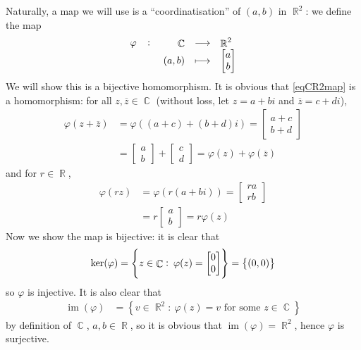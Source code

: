 \documentclass{amsart}
\theoremstyle{definition}
\theoremstyle{definition}
\DeclareMathOperator{\R}{\mathbb{R}}
\DeclareMathOperator{\Com}{\mathbb{C}}
\DeclareMathOperator{\im}{im}
\DeclareMathOperator{\1}{\mathbbm{1}}
\renewcommand{\phi}{\varphi}
\newcommand{\condset}[4]{\left\{ #1  : \: #2 #3 #4 \right\}}
\begin{document}
\begin{enumerate}
\begin{enumerate}[label=\arabic*.]
			Naturally, a map we will use is a ``coordinatisation'' of $(a,b)$ in $\R^2$: we define the map
			\begin{equation}
			\label{eqCR2map}
				\fullfunction{\phi}{\Com}{\R^2}{(a,b)}{\begin{bmatrix}
					a \\ b
					\end{bmatrix}}
			\end{equation}
			We will show this is a bijective homomorphism. It is obvious that \eqref{eqCR2map} is a homomorphism: for all $z, \overline{z} \in \Com$ (without loss, let $z = a+bi$ and $\overline{z}=c + di$),
			\begin{align*}
			\phi(z + \overline{z}) &= \phi( (a+c) + (b+d)i ) = \begin{bmatrix}
			a+ c \\ b+d
			\end{bmatrix} \\
			&= \begin{bmatrix}
			a \\ b
			\end{bmatrix} + \begin{bmatrix}
			c \\ d
			\end{bmatrix} = \phi(z) + \phi(\overline{z})
			\end{align*}
			and for $r \in \R$,
			\begin{align*}
			\phi(rz) &= \phi(r(a+bi)) = \begin{bmatrix}
			ra \\ rb
			\end{bmatrix} \\
			&= r \begin{bmatrix}
			a \\ b
			\end{bmatrix} = r\phi(z)
			\end{align*}
			Now we show the map is bijective: it is clear that 
			\begin{align*}
			\ker(\phi) = \condset{z \in \Com}{\phi(z)}{=}{\begin{bmatrix}
				0 \\ 0
				\end{bmatrix}} = \set{(0,0)}
			\end{align*}
			so $\phi$ is injective. It is also clear that 
			\begin{align*}
				\im(\phi) &= \condset{v \in \R^2}{\phi(z)}{=}{v \text{ for some } z \in \Com}
			\end{align*}
			by definition of $\Com$, $a,b \in \R$, so it is obvious that $\im(\phi) = \R^2$, hence $\phi$ is surjective.
			

\end{enumerate}
\end{enumerate}
\end{document}
